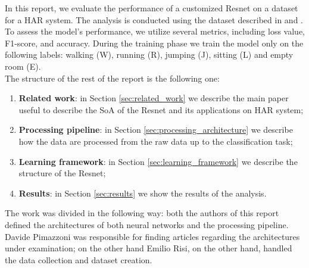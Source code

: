 In this report, we evaluate the performance of a customized Resnet on a dataset for a HAR system. The analysis is conducted using the dataset described in \cite{MeneghelloDataset-2023} and \cite{MeneghelloNN-2023}. To assess the model's performance, we utilize several metrics, including loss value, F1-score, and accuracy.
During the training phase we train the model only on the following labels: walking (W), running (R), jumping (J), sitting (L) and empty room (E).\\
The structure of the rest of the report is the following one:
\begin{enumerate}
    \item \textbf{Related work}: in Section \ref{sec:related_work} we describe the main paper useful to describe the SoA of the Resnet and its applications on HAR system;
    
    \item \textbf{Processing pipeline}: in Section \ref{sec:processing_architecture} we describe how the data are processed from the raw data up to the classification task;
    
    \item \textbf{Learning framework}: in Section \ref{sec:learning_framework} we describe the structure of the Resnet;

    \item \textbf{Results}: in Section \ref{sec:results} we show the results of the analysis.
\end{enumerate}

The work was divided in the following way: both the authors of this report defined the architectures of both neural networks and the processing pipeline. Davide Pimazzoni was responsible for finding articles regarding the architectures under examination; on the other hand Emilio Risi, on the other hand, handled the data collection and dataset creation.


